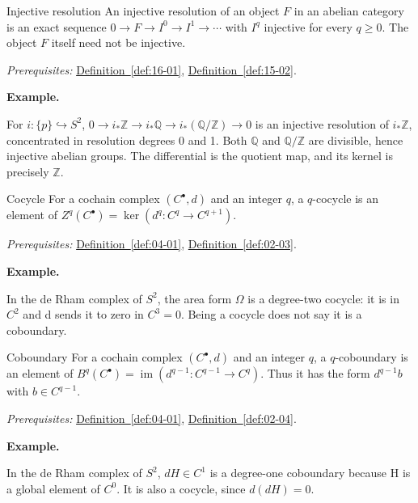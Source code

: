 \documentclass[11pt]{article}
\makeatletter
\newcounter{definition}
\newcommand{\Q}{\mathbb Q}
\newcommand{\Z}{\mathbb Z}
\newcommand{\exampleheading}{\par\medskip\textbf{Example.}\par\smallskip}
\newcommand{\currentdefinition}[1]{\protected@edef\@currentlabel{#1}}
\makeatother
\begin{document}
\begin{definitionbox}{Injective resolution}
\currentdefinition{\thedefinition}
\label{def:16-02}
An injective resolution of an object $F$ in an abelian category is an exact sequence $0\to F\to I^0\to I^1\to\cdots$ with $I^q$ injective for every $q\ge0$. The object $F$ itself need not be injective.

\smallskip
\textit{Prerequisites:} \hyperref[def:16-01]{Definition~\ref*{def:16-01}}, \hyperref[def:15-02]{Definition~\ref*{def:15-02}}.

\exampleheading
For $i:\{p\}\hookrightarrow S^2$, $0\to i_*\Z\to i_*\Q\to i_*(\Q/\Z)\to0$ is an injective resolution of $i_*\Z$, concentrated in resolution degrees 0 and 1. Both $\Q$ and $\Q/\Z$ are divisible, hence injective abelian groups. The differential is the quotient map, and its kernel is precisely $\Z$.
\end{definitionbox}

\begin{definitionbox}{Cocycle}
\currentdefinition{\thedefinition}
\label{def:04-02}
For a cochain complex $(C^\bullet,d)$ and an integer $q$, a $q$-cocycle is an element of $Z^q(C^\bullet)=\ker(d^q:C^q\to C^{q+1})$.

\smallskip
\textit{Prerequisites:} \hyperref[def:04-01]{Definition~\ref*{def:04-01}}, \hyperref[def:02-03]{Definition~\ref*{def:02-03}}.

\exampleheading
In the de Rham complex of $S^2$, the area form $\Omega$ is a degree-two cocycle: it is in $C^2$ and d sends it to zero in $C^3=0$. Being a cocycle does not say it is a coboundary.
\end{definitionbox}

\begin{definitionbox}{Coboundary}
\currentdefinition{\thedefinition}
\label{def:04-03}
For a cochain complex $(C^\bullet,d)$ and an integer $q$, a $q$-coboundary is an element of $B^q(C^\bullet)=\operatorname{im}(d^{q-1}:C^{q-1}\to C^q)$. Thus it has the form $d^{q-1}b$ with $b\in C^{q-1}$.

\smallskip
\textit{Prerequisites:} \hyperref[def:04-01]{Definition~\ref*{def:04-01}}, \hyperref[def:02-04]{Definition~\ref*{def:02-04}}.

\exampleheading
In the de Rham complex of $S^2$, $dH\in C^1$ is a degree-one coboundary because H is a global element of $C^0$. It is also a cocycle, since $d(dH)=0$.
\end{definitionbox}
\end{document}
